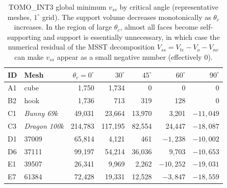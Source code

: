\begin{table}[H]
\footnotesize
\centering
\caption{TOMO\_INT3 global minimum $v_{ss}$ by critical angle (representative meshes, $1^\circ$ grid).
The support volume decreases monotonically as $\theta_c$ increases.
In the region of large $\theta_c$, almost all faces become self-supporting and support is essentially unnecessary,
in which case the numerical residual of the MSST decomposition $V_{ss}=V_{tc}-V_o-V_{nv}$ can make $v_{ss}$ appear as a small negative number (effectively $0$).}
\label{stab:critangle}
\begin{tabular}{llrrrrr}
\toprule
ID & Mesh & $\theta_c{=}0^\circ$ & $30^\circ$ & $45^\circ$ & $60^\circ$ & $90^\circ$\\
\midrule
A1 & cube & 1{,}750 & 1{,}734 & 0 & 0 & 0\\
B2 & hook & 1{,}736 & 713 & 319 & 128 & 0\\
C1 & \emph{Bunny 69k} & 49{,}031 & 23{,}664 & 13{,}970 & 3{,}201 & $-11{,}049$\\
C3 & \emph{Dragon 100k} & 214{,}783 & 117{,}195 & 82{,}554 & 24{,}447 & $-18{,}087$\\
D1 & 37009 & 65{,}814 & 4{,}121 & 461 & $-1{,}238$ & $-10{,}002$\\
D6 & 37111 & 99{,}197 & 54{,}214 & 36{,}036 & 9{,}703 & $-10{,}653$\\
E1 & 39507 & 26{,}341 & 9{,}969 & 2{,}262 & $-10{,}252$ & $-19{,}031$\\
E7 & 61384 & 72{,}428 & 19{,}331 & 12{,}528 & $-3{,}847$ & $-18{,}559$\\
\bottomrule
\end{tabular}
\end{table}
